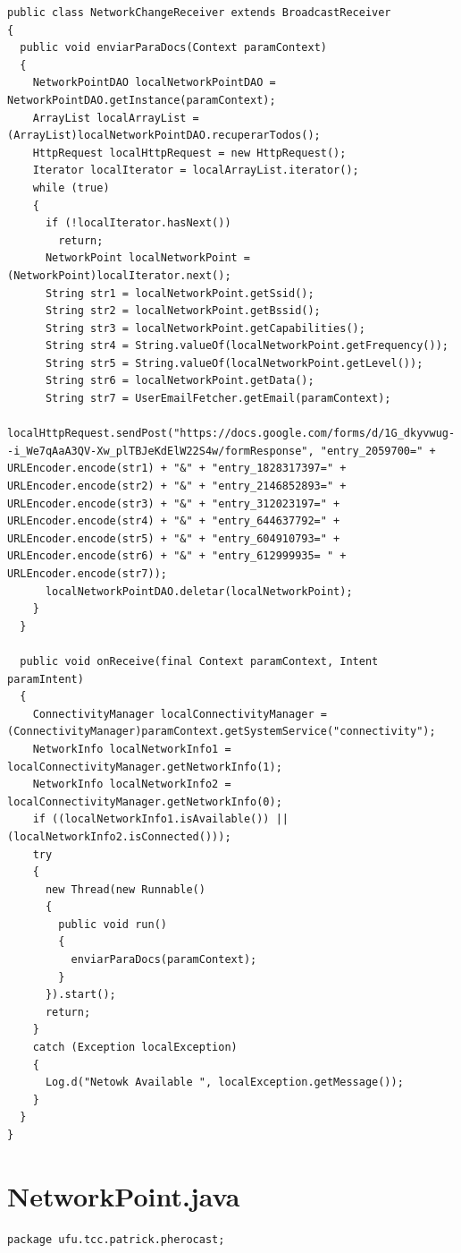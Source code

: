 \documentclass[12pt, %
openright, 
oneside, %
a4paper,    %
brazil]{facom-ufu-abntex2}
\begin{document}
\begin{anexosenv}
\begin{lstlisting}
public class NetworkChangeReceiver extends BroadcastReceiver
{
  public void enviarParaDocs(Context paramContext)
  {
    NetworkPointDAO localNetworkPointDAO = NetworkPointDAO.getInstance(paramContext);
    ArrayList localArrayList = (ArrayList)localNetworkPointDAO.recuperarTodos();
    HttpRequest localHttpRequest = new HttpRequest();
    Iterator localIterator = localArrayList.iterator();
    while (true)
    {
      if (!localIterator.hasNext())
        return;
      NetworkPoint localNetworkPoint = (NetworkPoint)localIterator.next();
      String str1 = localNetworkPoint.getSsid();
      String str2 = localNetworkPoint.getBssid();
      String str3 = localNetworkPoint.getCapabilities();
      String str4 = String.valueOf(localNetworkPoint.getFrequency());
      String str5 = String.valueOf(localNetworkPoint.getLevel());
      String str6 = localNetworkPoint.getData();
      String str7 = UserEmailFetcher.getEmail(paramContext);
      localHttpRequest.sendPost("https://docs.google.com/forms/d/1G_dkyvwug--i_We7qAaA3QV-Xw_plTBJeKdElW22S4w/formResponse", "entry_2059700=" + URLEncoder.encode(str1) + "&" + "entry_1828317397=" + URLEncoder.encode(str2) + "&" + "entry_2146852893=" + URLEncoder.encode(str3) + "&" + "entry_312023197=" + URLEncoder.encode(str4) + "&" + "entry_644637792=" + URLEncoder.encode(str5) + "&" + "entry_604910793=" + URLEncoder.encode(str6) + "&" + "entry_612999935= " + URLEncoder.encode(str7));
      localNetworkPointDAO.deletar(localNetworkPoint);
    }
  }

  public void onReceive(final Context paramContext, Intent paramIntent)
  {
    ConnectivityManager localConnectivityManager = (ConnectivityManager)paramContext.getSystemService("connectivity");
    NetworkInfo localNetworkInfo1 = localConnectivityManager.getNetworkInfo(1);
    NetworkInfo localNetworkInfo2 = localConnectivityManager.getNetworkInfo(0);
    if ((localNetworkInfo1.isAvailable()) || (localNetworkInfo2.isConnected()));
    try
    {
      new Thread(new Runnable()
      {
        public void run()
        {
          enviarParaDocs(paramContext);
        }
      }).start();
      return;
    }
    catch (Exception localException)
    {
      Log.d("Netowk Available ", localException.getMessage());
    }
  }
}

\end{lstlisting}
\section{NetworkPoint.java}
\begin{lstlisting}
package ufu.tcc.patrick.pherocast;


\end{lstlisting}
\end{anexosenv}
\end{document}
